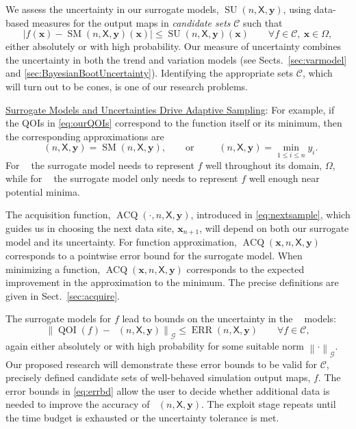 \documentclass[11pt]{NSFamsart}
\newcommand{\Upara}[1]{\noindent\underline{\upshape #1}:}
\DeclareMathOperator{\QOI}{QOI} %
\DeclareMathOperator{\APP}{\widehat{\QOI}}
\DeclareMathOperator{\SURR}{SM} %
\DeclareMathOperator{\ERR}{ERR}
\DeclareMathOperator{\VAL}{ACQ}
\DeclareMathOperator{\MIN}{MIN}
\DeclareMathOperator{\ID}{ID}
\DeclareMathOperator{\APPMIN}{\widehat{\MIN}}
\DeclareMathOperator{\APPID}{\widehat{\ID}}
\DeclareMathOperator{\SURRERR}{SU}
\newcommand{\mX}{\mathsf{X}}
\newcommand{\bx}{{\boldsymbol{x}}}
\newcommand{\by}{{\boldsymbol{y}}}
\newcommand{\calc}{{\mathcal{C}}}
\newcommand{\calg}{{\mathcal{G}}}
\def\abs#1{\ensuremath{\left \lvert #1 \right \rvert}}
\newcommand{\norm}[2][{}]{\ensuremath{\left \lVert #2 \right \rVert}_{#1}}
\newcommand{\bignorm}[2][{}]{\ensuremath{\bigl \lVert #2 \bigr \rVert}_{#1}}
\begin{document}
We assess the uncertainty in our surrogate models, $\SURRERR(n,\mX,\by)$, using data-based measures for the output maps in \emph{candidate sets} $\calc$ such that 
\begin{equation} \label{eq:surrUncert}
\abs{f(\bx)-\SURR(n,\mX,\by)(\bx)} \le \SURRERR(n,\mX,\by)(\bx) \qquad \forall f \in \calc,\ \bx \in \Omega,
\end{equation} 
either absolutely or with high probability. Our measure of uncertainty combines the uncertainty in both the trend and variation models (see Sects.\ \ref{sec:varmodel} and \ref{sec:BayesianBootUncertainty}). Identifying the appropriate sets $\calc$, which will turn out to be cones, is one of our research problems.

\Upara{Surrogate Models and Uncertainties Drive Adaptive Sampling} 
For example, if the QOIs in \eqref{eq:ourQOIs} correspond to the function itself or its minimum, then the corresponding approximations are
\begin{equation} \label{eq:QOIhat}
\APPID(n,\mX,\by) = \SURR(n,\mX,\by), \qquad \text{or}\qquad \APPMIN(n,\mX,\by) = \min_{1 \le i \le n} y_i.
\end{equation}
For $\APPID$ the surrogate model needs to represent $f$ well throughout its domain, $\Omega$, while for $\APPMIN$ the surrogate model only needs to represent $f$ well enough near potential minima.

The acquisition function, $\VAL(\cdot,n,\mX, \by)$, introduced in \eqref{eq:nextsample}, which guides us in choosing the next data site, $\bx_{n+1}$, will depend on both our surrogate model and its uncertainty. For function approximation, $\VAL(\bx,n,\mX, \by)$ corresponds to a pointwise error bound for the surrogate model. When minimizing a function, $\VAL(\bx,n,\mX, \by)$ corresponds to the expected improvement in the approximation to the minimum. The precise definitions are given in Sect.\ \ref{sec:acquire}.

The surrogate models for $f$ lead to bounds on the uncertainty in the $\APP$ models:
\begin{equation} \label{eq:errbd}
\bignorm[\calg]{\QOI(f) - \APP(n,\mX,\by)} \le \ERR(n,\mX,\by) \qquad \forall f \in \calc,
\end{equation}
again either absolutely or with high probability for some suitable norm $\norm[\calg]{\cdot}$. Our proposed research will demonstrate these error bounds to be valid for $\calc$, precisely defined candidate sets of well-behaved simulation output maps, $f$. The error bounds in \eqref{eq:errbd} allow the user to decide whether additional data is needed to improve the accuracy of $\APP(n,\mX,\by)$. The exploit stage repeats until the time budget is exhausted or the uncertainty tolerance is met.
\end{document}
